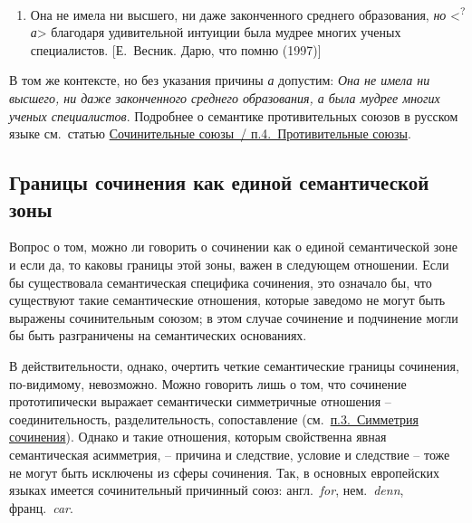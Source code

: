 \begin{enumerate}
\def\labelenumi{(\arabic{enumi})}
\setcounter{enumi}{175}
\item
  Она не имела ни высшего, ни даже законченного среднего образования,
  \emph{но} \textless{}\textsuperscript{?}\emph{а}\textgreater{}
  благодаря удивительной интуиции была мудрее многих ученых
  специалистов. {[}Е.~Весник. Дарю, что помню (1997){]}
\end{enumerate}

В том же контексте, но без указания причины \emph{а} допустим: \emph{Она
не имела ни высшего, ни даже законченного среднего образования, а была
мудрее многих ученых специалистов}. Подробнее о семантике противительных
союзов в русском языке см.~статью \underline{Сочинительные союзы~/
п.4.~Противительные союзы}.

\hypertarget{ux433ux440ux430ux43dux438ux446ux44b-ux441ux43eux447ux438ux43dux435ux43dux438ux44f-ux43aux430ux43a-ux435ux434ux438ux43dux43eux439-ux441ux435ux43cux430ux43dux442ux438ux447ux435ux441ux43aux43eux439-ux437ux43eux43dux44b}{%
\subsection{Границы сочинения как единой семантической
зоны}\label{ux433ux440ux430ux43dux438ux446ux44b-ux441ux43eux447ux438ux43dux435ux43dux438ux44f-ux43aux430ux43a-ux435ux434ux438ux43dux43eux439-ux441ux435ux43cux430ux43dux442ux438ux447ux435ux441ux43aux43eux439-ux437ux43eux43dux44b}}

Вопрос о том, можно ли говорить о сочинении как о единой семантической
зоне и если да, то каковы границы этой зоны, важен в следующем
отношении. Если бы существовала семантическая специфика сочинения, это
означало бы, что существуют такие семантические отношения, которые
заведомо не могут быть выражены сочинительным союзом; в этом случае
сочинение и подчинение могли бы быть разграничены на семантических
основаниях.

В действительности, однако, очертить четкие семантические границы
сочинения, по-видимому, невозможно. Можно говорить лишь о том, что
сочинение прототипически выражает семантически симметричные отношения --
соединительность, разделительность, сопоставление
(см.~\underline{п.3.~Симметрия сочинения}). Однако и такие отношения,
которым свойственна явная семантическая асимметрия, -- причина и
следствие, условие и следствие -- тоже не могут быть исключены из сферы
сочинения. Так, в основных европейских языках имеется сочинительный
причинный союз: англ.~\emph{for}, нем.~\emph{denn}, франц.~\emph{car}.

